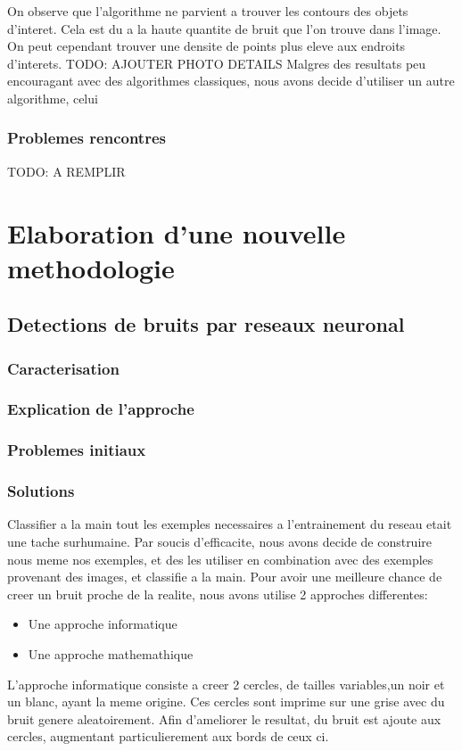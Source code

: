 \documentclass[a4paper, 12pt, titlepage, oneside]{article}
\begin{document}
	On observe que l'algorithme ne parvient a trouver les contours des objets d'interet. Cela est du a la haute quantite de bruit que l'on trouve dans l'image. On 
	peut cependant trouver une densite de points plus eleve aux endroits d'interets.
	TODO: AJOUTER PHOTO DETAILS 
	Malgres des resultats peu encouragant avec des algorithmes classiques, nous avons decide d'utiliser un autre algorithme, celui
	
	\subsubsection{Problemes rencontres}
	TODO: A REMPLIR
	
\newpage
\section{Elaboration d'une nouvelle methodologie}
	\subsection{Detections de bruits par reseaux neuronal}
	\subsubsection{Caracterisation}
	\subsubsection{Explication de l'approche}
	\subsubsection{Problemes initiaux}
	\subsubsection{Solutions}
	Classifier a la main tout les exemples necessaires a l'entrainement du reseau etait une tache surhumaine. Par soucis d'efficacite, nous avons decide de construire nous meme
	nos exemples, et des les utiliser en combination avec des exemples provenant des images, et classifie a la main.
	Pour avoir une meilleure chance de creer un bruit proche de la realite, nous avons utilise 2 approches differentes:
	\begin{itemize}
		\item Une approche informatique
		\item Une approche mathemathique
	\end{itemize}
	L'approche informatique consiste a creer 2 cercles, de tailles variables,un noir et un blanc, ayant la meme origine. Ces cercles sont imprime sur une  grise
	avec du bruit genere aleatoirement. Afin d'ameliorer le resultat, du bruit est ajoute aux cercles, augmentant particulierement aux bords de ceux ci.
	
\end{document}
